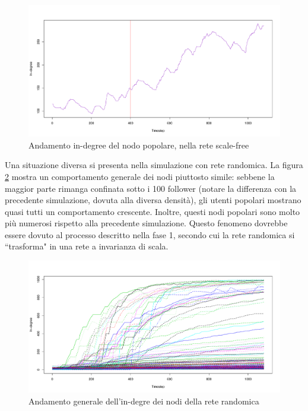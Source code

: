 \documentclass[a4paper,12pt]{article}
\begin{document}
\begin{figure}[H]
\centering
\includegraphics[scale=0.5]{images/gasparri_1000_sf_1080_1.pdf}
\caption{Andamento in-degree del nodo popolare, nella rete scale-free}
\label{fig:g1}
\end{figure}
Una situazione diversa si presenta nella simulazione con rete randomica. La figura \ref{fig:mat2} mostra un comportamento generale dei nodi piuttosto simile: sebbene la maggior parte rimanga confinata sotto i 100 follower (notare la differenza con la precedente simulazione, dovuta alla diversa densità), gli utenti popolari mostrano quasi tutti un comportamento crescente. Inoltre, questi nodi popolari sono molto più numerosi rispetto alla precedente simulazione. Questo fenomeno dovrebbe essere dovuto al processo descritto nella fase 1, secondo cui la rete randomica si ``trasforma" in una rete a invarianza di scala.
\begin{figure}[H]
\centering
\includegraphics[scale=0.5]{images/totale_1000_rnd_1080_1_1.pdf}
\caption{Andamento generale dell'in-degre dei nodi della rete randomica}
\label{fig:mat2}
\end{figure}
\end{document}
